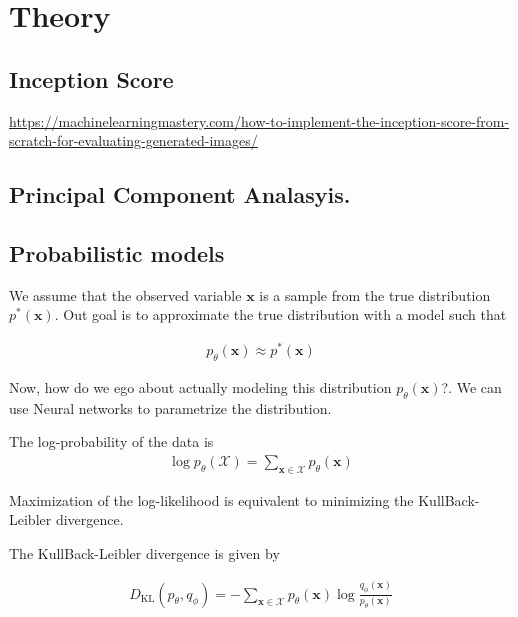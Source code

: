 \chapter{Theory}


\section{Inception Score}
\url{https://machinelearningmastery.com/how-to-implement-the-inception-score-from-scratch-for-evaluating-generated-images/}


\section{Principal Component Analasyis. }

\section{Probabilistic models}
We assume that the observed variable $\mathbf{x}$ is a sample from the true distribution $p^*(\mathbf{x})$.\cite{vaeintro} Out goal is to approximate the true distribution with a model such that

\begin{align}
  p_\theta(\mathbf{x})\approx p^*(\mathbf{x})
\end{align}

Now, how do we ego about actually modeling this distribution $p_\theta(\mathbf{x})$?. We can use Neural networks to parametrize the distribution.

The log-probability of the data is
\begin{align}
  \log p_\theta(\mathcal{X}) = \sum_{\mathbf{x}\in\mathcal{X}} p_\theta(\mathbf{x})
\end{align}

Maximization of the log-likelihood is equivalent to minimizing the KullBack-Leibler divergence.

The KullBack-Leibler divergence is given by

\begin{align}
D_{\text{KL}}(p_\theta,q_\phi) = -\sum_{\mathbf{x}\in\mathcal{X}}p_\theta(\mathbf{x})\log \frac{q_\phi(\mathbf{x})}{p_\theta(\mathbf{x})}
\end{align}



